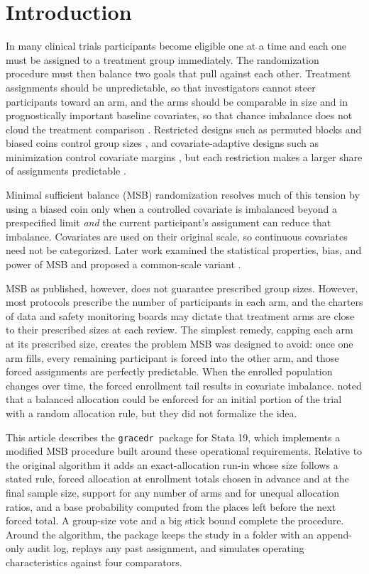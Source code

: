\documentclass[bib]{statapress}
\newcommand{\gracedr}{\texttt{gracedr}}
\begin{document}
\section{Introduction}

In many clinical trials participants become eligible one at a time and each one must be
assigned to a treatment group immediately. The randomization procedure must then
balance two goals that pull against each other. Treatment assignments should be
unpredictable, so that investigators cannot steer participants toward an arm,
and the arms should be comparable in size and in prognostically important
baseline covariates, so that chance imbalance does not cloud the treatment
comparison \citep{rosenberger2016,berger2005,altman1990}. Restricted designs
such as permuted blocks and biased coins control group sizes
\citep{efron1971,wei1978,soares1983,berger2003}, and covariate-adaptive designs
such as minimization control covariate margins
\citep{taves1974,pocock1975,scott2002}, but each restriction makes a larger
share of assignments predictable \citep{blackwell1957,zhao2012compare}.

Minimal sufficient balance (MSB) randomization \citep{zhao2015msb} resolves
much of this tension by using a biased coin only when a controlled covariate is
imbalanced beyond a prespecified limit \emph{and} the current participant's
assignment can reduce that imbalance. Covariates are used on their original
scale, so continuous covariates need not be categorized. Later work examined
the statistical properties, bias, and power of MSB
\citep{lauzon2020msb,lauzon2022msb} and proposed a common-scale variant
\citep{johns2022csmsb}.

MSB as published, however, does not guarantee prescribed group sizes. However, most
protocols prescribe the number of participants in each arm, and the charters of
data and safety monitoring boards may dictate that treatment arms are close to their
prescribed sizes at each review. The simplest remedy, capping each arm at its
prescribed size, creates the problem MSB was designed to avoid: once one arm
fills, every remaining participant is forced into the other arm, and those
forced assignments are perfectly predictable. When the enrolled population
changes over time, the forced enrollment tail results in covariate
imbalance. \citet{zhao2015msb} noted that a balanced allocation could be
enforced for an initial portion of the trial with a random allocation rule,
but they did not formalize the idea.

This article describes the \gracedr\ package for Stata 19, which implements a
modified MSB procedure built around these operational requirements. Relative
to the original algorithm it adds an exact-allocation run-in whose size follows
a stated rule, forced allocation at enrollment totals chosen in advance and at
the final sample size, support for any number of arms and for unequal
allocation ratios, and a base probability computed from the places left before
the next forced total. A group-size vote and a big stick bound
\citep{soares1983} complete the procedure. Around the algorithm, the package
keeps the study in a folder with an append-only audit log, replays any past
assignment, and simulates operating characteristics against four comparators.
\end{document}
